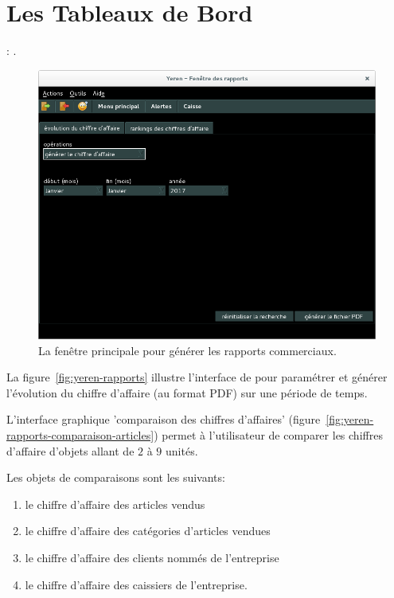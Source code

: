 \chapter{Les Tableaux de Bord}\label{chap:tableaux-de-bord}

\utilisateurs: \lienmanager.\\


\label{sec:tableaux-introduction}

\begin{figure}[!htbp]
	\centering
	\includegraphics[scale=0.45]{images/yeren-rapports.png}
	\caption{La fen\^etre principale pour g\'en\'erer les rapports commerciaux.}
	\label{fig:yeroth-tableaux}
\end{figure}

La figure~\ref{fig:yeren-rapports} illustre l'interface
de \yeren pour param\'etrer et g\'en\'erer l'\'evolution
du chiffre d'affaire (au format PDF) sur une p\'eriode de temps.

L'interface graphique 'comparaison des chiffres d'affaires'
(figure~\ref{fig:yeren-rapports-comparaison-articles})
permet \`a l'utilisateur de comparer les chiffres
d'affaire d'objets allant de $2$ \`a $9$ unit\'es.

Les objets de comparaisons sont les suivants:
\begin{enumerate}[1)]
	\item le chiffre d'affaire des articles vendus
	\item le chiffre d'affaire des cat\'egories d'articles vendues
	\item le chiffre d'affaire des clients nomm\'es de l'entreprise
	\item le chiffre d'affaire des caissiers de l'entreprise.\\
\end{enumerate}

